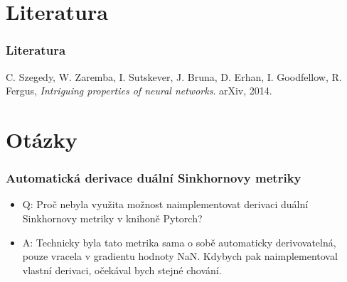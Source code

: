 \documentclass[czech]{beamer}
\begin{document}
\section*{Literatura}

\begin{frame}
    \frametitle{Literatura}
    \begin{thebibliography}{1}


         C. Szegedy, W. Zaremba, I. Sutskever, J. Bruna, D. Erhan, I. Goodfellow, R. Fergus,
        \emph{Intriguing properties of neural networks}.
        arXiv, 2014.

    \end{thebibliography}
\end{frame}

\section{Otázky}

\begin{frame}
    \frametitle{Automatická derivace duální Sinkhornovy metriky}
    \begin{itemize}
        \item Q: Proč nebyla využita možnost naimplementovat derivaci duální Sinkhornovy metriky v knihoně Pytorch?
        \item A: Technicky byla tato metrika sama o sobě automaticky derivovatelná, pouze vracela v gradientu hodnoty NaN.
        Kdybych pak naimplementoval vlastní derivaci, očekával bych stejné chování.
    \end{itemize}
\end{frame}
\end{document}
